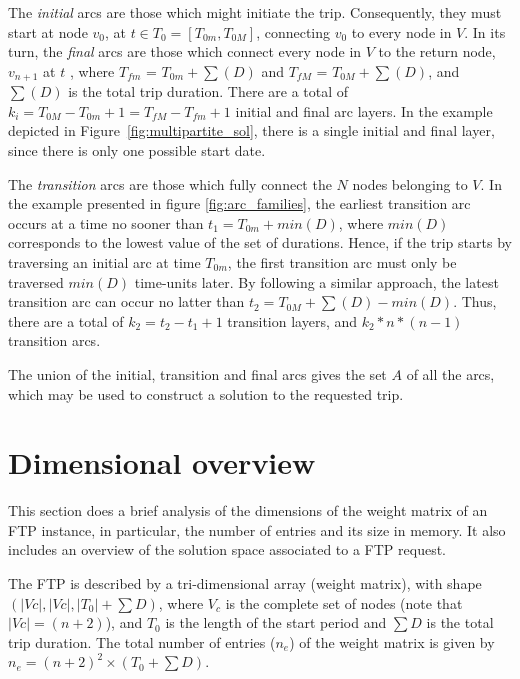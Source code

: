 The \textit{initial} arcs are those which might initiate the trip. Consequently, they must start at node $v_0$, at $t \in T_0 = [T_{0m}, T_{0M}]$, connecting $v_0$ to every node in $V$. In its turn, the \textit{final} arcs are those which connect every node in $V$ to the return node, $v_{n+1}$ at $t$ \in [$T_{fm}$, $T_{fM}$], where $T_{fm}$ = $T_{0m} + \sum(D)$ and $T_{fM}$ = $T_{0M} + \sum(D)$, and $\sum(D)$ is the total trip duration. There are a total of $k_i = T_{0M} - T_{0m} + 1 = T_{fM} -T_{fm} + 1$ initial and final arc layers. In the example depicted in Figure~\ref{fig:multipartite_sol}, there is a single initial and final layer, since there is only one possible start date.

The \textit{transition} arcs are those which fully connect the $N$ nodes belonging to $V$. In the example presented in figure \ref{fig:arc_families}, the earliest transition arc occurs at a time no sooner than $t_1 = T_{0m} + min(D)$, where $min(D)$ corresponds to the lowest value of the set of durations. Hence, if the trip starts by traversing an initial arc at time $T_{0m}$, the first transition arc must only be traversed $min(D)$ time-units later. By following a similar approach, the latest transition arc can occur no latter than $t_2 = T_{0M} + \sum(D) - min(D)$. Thus, there are a total of $k_2 = t_2-t_1+1$ transition layers, and $k_2*n*(n-1)$ transition arcs.

The union of the initial, transition and final arcs gives the set $A$ of all the arcs, which may be used to construct a solution to the requested trip. 







\section{Dimensional overview}
\label{sec:dimensions}

This section 
does a brief analysis of the dimensions of the weight matrix of an FTP instance, in particular, the number of entries and its size in memory. It also includes an overview of the solution space associated to a FTP request. 

The FTP is described by a tri-dimensional array (weight matrix), with shape $(|Vc|,|Vc|, |T_{0}| + \sum D)$, where $V_c$ is the complete set of nodes (note that$|Vc|=(n+2)$), and $T_{0}$ is the length of the start period and $\sum D$ is the total trip duration. The total number of entries ($n_e$) of the weight matrix is given by $n_{e} = (n+2)^2\times(T_{0} + \sum D)$. 

